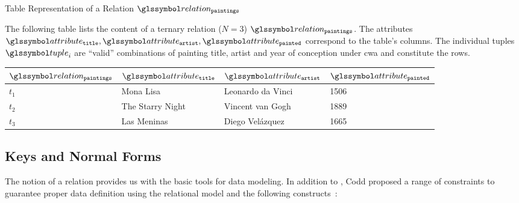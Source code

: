\begin{example}[label=example:relational_table]{Table Representation of a Relation $\relation_{\mathtt{paintings}}$}{}
    
    The following table lists the content of a ternary relation ($N = 3$) $\relation_{\mathtt{paintings}}$. The attributes $\attribute_{\mathtt{title}}, \attribute_{\mathtt{artist}}, \attribute_{\mathtt{painted}}$ correspond to the table's columns. The individual tuples $\tuple_i$ are ``valid'' combinations of painting title, artist and year of conception under \acrshort{cwa} and constitute the rows.
        
    \begin{center}
        \begin{tabular}{ l || l | l | l |}
            $\relation_{\mathtt{paintings}}$ & $\attribute_\mathtt{title}$  & $\attribute_{\mathtt{artist}}$  & $\attribute_{\mathtt{painted}}$ \\ 
            \hline
            \hline
            $t_1$ & Mona Lisa &  Leonardo da Vinci & 1506 \\
            \hline
            $t_2$ & The Starry Night & Vincent van Gogh & 1889 \\
            \hline
            $t_3$ & Las Meninas & Diego Velázquez & 1665 \\
            \hline
        \end{tabular}
    \end{center}
\end{example}


\subsection{Keys and Normal Forms}

The notion of a relation provides us with the basic tools for data modeling. In addition to , Codd proposed a range of constraints to guarantee proper data definition using the relational model and the following constructs~\cite{Codd:1970Relational}:

